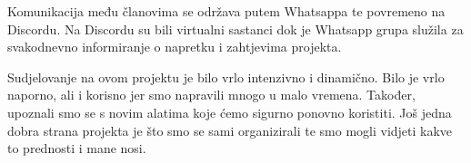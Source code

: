 	Komunikacija među članovima se održava putem Whatsappa te povremeno na Discordu. Na Discordu su bili virtualni sastanci dok je Whatsapp grupa služila za svakodnevno informiranje o napretku i zahtjevima projekta.\par
	
	Sudjelovanje na ovom projektu je bilo vrlo intenzivno i dinamično. Bilo je vrlo naporno, ali i korisno jer smo napravili mnogo u malo vremena. Također, upoznali smo se s novim alatima koje ćemo sigurno ponovno koristiti. Još jedna dobra strana projekta je što smo se sami organizirali te smo mogli vidjeti kakve to prednosti i mane nosi.
		

		
		
		\eject 